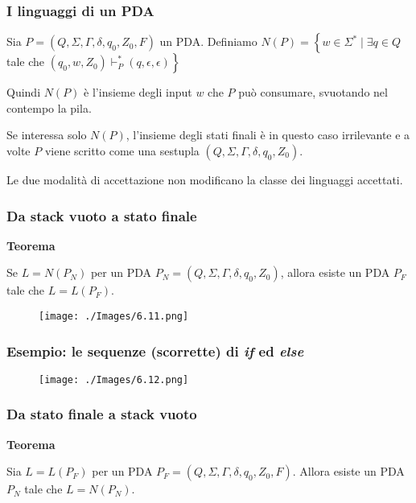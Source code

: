 \subsubsection{I linguaggi di un PDA}

Sia $P=\left(Q, \Sigma, \Gamma, \delta, q_{0}, Z_{0}, F\right)$ un PDA. Definiamo $N(P)=\left\{w \in \Sigma^{*} \mid \exists q \in Q\right.$ tale che $\left.\left(q_{0}, w, Z_{0}\right) \vdash^{*}_P(q, \epsilon, \epsilon)\right\}$

Quindi $N(P)$ è l'insieme degli input $w$ che $P$ può consumare, svuotando nel contempo la pila.

Se interessa solo $N(P)$, l'insieme degli stati finali è in questo caso irrilevante e a volte $P$ viene scritto come una sestupla $\left(Q, \Sigma, \Gamma, \delta, q_{0}, Z_{0}\right)$.

Le due modalità di accettazione non modificano la classe dei linguaggi accettati.

\subsubsection{Da stack vuoto a stato finale}
\textbf{Teorema}

Se $L=N\left(P_{N}\right)$ per un PDA $P_{N}=\left(Q, \Sigma, \Gamma, \delta, q_{0}, Z_{0}\right)$, allora esiste un PDA $P_{F}$ tale che $L=L\left(P_{F}\right)$.

\begin{figure}[hbpt!]
    \centering
    \texttt{[image: ./Images/6.11.png]}
\end{figure}
\FloatBarrier

\subsubsection{Esempio: le sequenze (scorrette) di \textit{if} ed \textit{else}}

\begin{figure}[hbpt!]
    \centering
    \texttt{[image: ./Images/6.12.png]}
\end{figure}
\FloatBarrier

\subsubsection{Da stato finale a stack vuoto}

\textbf{Teorema}

Sia $L=L\left(P_{F}\right)$ per un PDA $P_{F}=\left(Q, \Sigma, \Gamma, \delta, q_{0}, Z_{0}, F\right)$. Allora esiste un PDA $P_{N}$ tale che $L=N\left(P_{N}\right)$.

